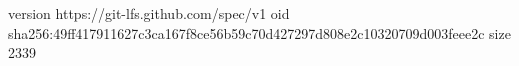 version https://git-lfs.github.com/spec/v1
oid sha256:49ff417911627c3ca167f8ce56b59c70d427297d808e2c10320709d003feee2c
size 2339
